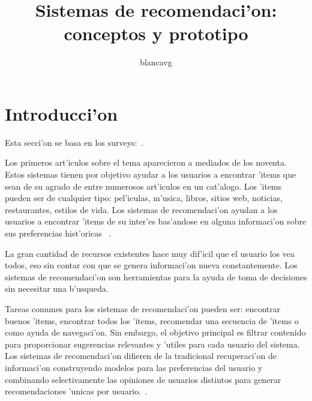 \documentclass[11pt]{article}
\begin{document}
\title{Sistemas de recomendaci'on: conceptos y prototipo}
\author{blancavg}

\maketitle
\section{Introducci'on}
Esta secci'on se basa en los surveys:~\cite{recsys:alban,start:candillier09,recsys:nlathia,almazrorecsys}.

\medskip
Los primeros art'iculos sobre el tema aparecieron a mediados de los noventa. Estos sistemas tienen por objetivo ayudar a los usuarios a encontrar 'items que sean de su agrado de entre numerosos art'iculos en un cat'alogo. Los 'items pueden ser de cualquier tipo: pel'iculas, m'usica, libros, sitios web, noticias, restaurantes, estilos de vida. Los sistemas de recomendaci'on ayudan a los usuarios a encontrar 'items de su inter'es bas'andose en alguna informaci'on sobre sus preferencias hist'oricas ~\cite{start:candillier09}.

La gran cantidad de recursos existentes hace muy dif'icil que el usuario los vea todos, eso sin contar con que se genera informaci'on nueva constantemente. Los sistemas de recomendaci'on son herramientas para la ayuda de toma de decisiones sin necesitar una b'usqueda. 

Tareas comunes para los sistemas de recomendaci'on pueden ser: encontrar buenos 'items, encontrar todos los 'items, recomendar una secuencia de 'items o como ayuda de navegaci'on. Sin embargo, el objetivo principal es filtrar contenido para proporcionar sugerencias relevantes y 'utiles para cada usuario del sistema. Los sistemas de recomendaci'on difieren de la tradicional recuperaci'on de informaci'on construyendo modelos para las preferencias del usuario y combinando selectivamente las opiniones de usuarios distintos para generar recomendaciones 'unicas por usuario.~\cite{recsys:nlathia}.
\end{document}
